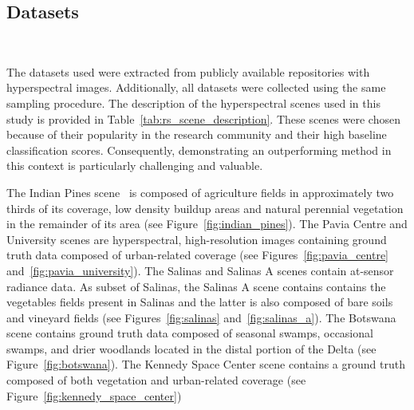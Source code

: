 \documentclass[parskip=full]{scrartcl}
\begin{document}
\subsection{Datasets}~\label{sec:datasets}

The datasets used were extracted from publicly available repositories with
hyperspectral images. Additionally, all datasets were collected using the
same sampling procedure. The description of the hyperspectral scenes used in
this study is provided in Table~\ref{tab:rs_scene_description}. These scenes
were chosen because of their popularity in the research community and their
high baseline classification scores. Consequently, demonstrating an
outperforming method in this context is particularly challenging and valuable.


The Indian Pines scene~\cite{Baumgardner2015} is composed of agriculture fields
in approximately two thirds of its coverage, low density buildup areas and
natural perennial vegetation in the remainder of its area (see
Figure~\ref{fig:indian_pines}). The Pavia Centre and University scenes are
hyperspectral, high-resolution images containing ground truth data composed of
urban-related coverage (see Figures~\ref{fig:pavia_centre}
and~\ref{fig:pavia_university}). The Salinas and Salinas A scenes contain
at-sensor radiance data. As subset of Salinas, the Salinas A scene contains
contains the vegetables fields present in Salinas and the latter is also
composed of bare soils and vineyard fields (see Figures~\ref{fig:salinas}
and~\ref{fig:salinas_a}). The Botswana scene contains ground truth data
composed of seasonal swamps, occasional swamps, and drier woodlands located in
the distal portion of the Delta (see Figure~\ref{fig:botswana}). The Kennedy
Space Center scene contains a ground truth composed of both vegetation and
urban-related coverage (see Figure~\ref{fig:kennedy_space_center})
\end{document}
